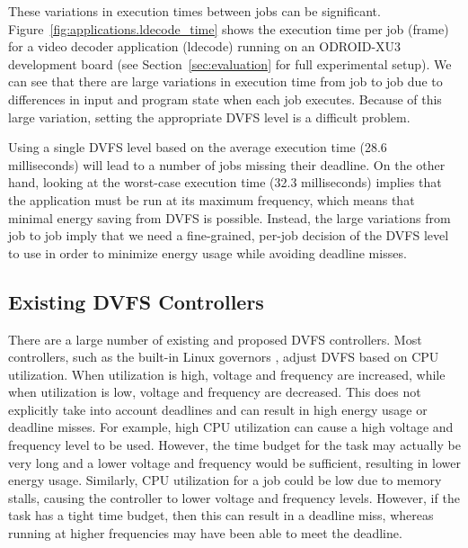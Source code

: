These variations in execution times between jobs can be significant. 
Figure~\ref{fig:applications.ldecode_time} shows the execution time per job (frame) for
a video decoder application (ldecode) running on an ODROID-XU3 development board (see
Section~\ref{sec:evaluation} for full experimental setup). We can see that
there
are large variations in execution time from job to job due to differences in
input and program state when each job executes. Because of this large
variation, setting the appropriate DVFS level is a difficult problem. 

Using a
single DVFS level based on the average execution time (28.6 milliseconds) will
lead to a number of jobs missing their deadline. On the other hand, looking at the
worst-case execution time (32.3 milliseconds) implies that the application must
be run at its maximum frequency, which means that minimal energy saving from DVFS is
possible. Instead, the large variations from job to job imply that we need a
fine-grained, per-job decision of the DVFS level to use in order to minimize
energy usage while avoiding deadline misses.

\subsection{Existing DVFS Controllers}
\label{sec:apps.existing}

There are a large number of existing and proposed DVFS controllers. Most
controllers, such as the built-in Linux governors \cite{linux_governors}, adjust DVFS based on 
CPU utilization. When utilization is high, voltage and frequency are
increased, while when utilization is low, voltage and frequency are decreased.
This does not explicitly take into account deadlines and can result in high
energy usage or deadline misses. For example, high CPU utilization can cause a
high voltage and frequency level to be used. However, the time budget for the task
may actually be very long and a lower voltage and frequency would be
sufficient, resulting in lower energy usage. Similarly, CPU utilization for a
job could be low due to memory stalls, causing the controller to lower voltage
and frequency levels. However, if the task has a tight time budget, then this can
result in a deadline miss, whereas running at higher frequencies may have been
able to meet the deadline.


